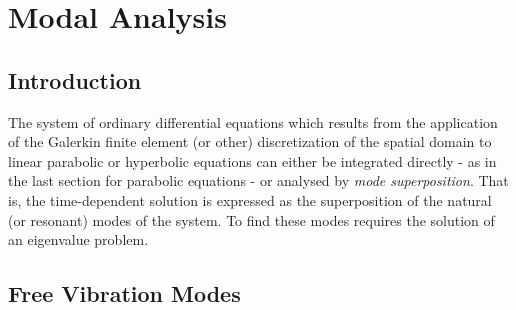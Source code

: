  \chapter{Modal Analysis}

\section{Introduction}

The system of ordinary differential equations which results from the
application of the Galerkin finite element (or other) discretization of the
spatial domain to linear parabolic or hyperbolic equations can either be
integrated directly - as in the last section for parabolic equations - or
analysed by \emph{mode superposition}. That is, the time-dependent solution
is expressed as the superposition of the natural (or resonant) modes of the
system. To find these modes requires the solution of an eigenvalue problem.

\section{Free Vibration Modes}

